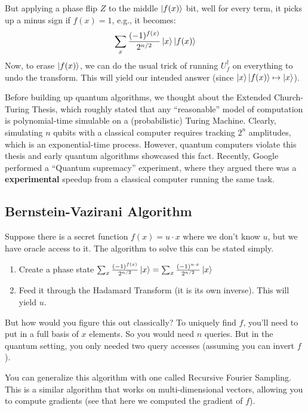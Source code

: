 But applying a phase flip $Z$ to the middle $\ket{f(x)}$ bit, well for every term, it picks up a minus sign if $f(x) = 1$, e.g.,
it becomes:
\[ \sum_x \frac{(-1)^{f(x)}}{2^{n/2}}\ket{x} \ket{f(x)} \]
Now, to erase $\ket{f(x)}$, we can do the usual trick of running $U_f^{\dagger}$ on everything to undo the transform. This will yield our intended answer (since $\ket{x} \ket{f(x)} \mapsto \ket{x}$).

Before building up quantum algorithms, we thought about the Extended Church-Turing Thesis, which roughly stated that any ``reasonable'' model of computation is
polynomial-time simulable on a (probabilistic) Turing Machine. Clearly, simulating $n$ qubits with a classical computer requires tracking $2^n$ amplitudes,
which is an exponential-time process. However, quantum computers violate this thesis and early quantum algorithms showcased this fact. Recently,
Google performed a ``Quantum supremacy'' experiment, where they argued there was a \textbf{experimental} speedup from a classical computer running the same task.

\subsection{Bernstein-Vazirani Algorithm}
Suppose there is a secret function $f(x) = u \cdot x$ where we don't know $u$,
but we have oracle access to it. The algorithm to solve this can be stated simply.

\begin{enumerate}
    \item Create a phase state $\sum_x \frac{(-1)^{f(x)}}{2^{n/2}} \ket{x} = \sum_x \frac{(-1)^{u \cdot x}}{2^{n/2}} \ket{x}$
    \item Feed it through the Hadamard Transform (it is its own inverse). This will yield $u$.
\end{enumerate}

But how would you figure this out classically? To uniquely find $f$, you'll need to put in a full basis of $x$ elements.
So you would need $n$ queries. But in the quantum setting, you only needed two query accesses (assuming you can invert $f$).

You can generalize this algorithm with one called Recursive Fourier Sampling. This is a similar algorithm that works on
multi-dimensional vectors, allowing you to compute gradients (see that here we computed the gradient of $f$).

